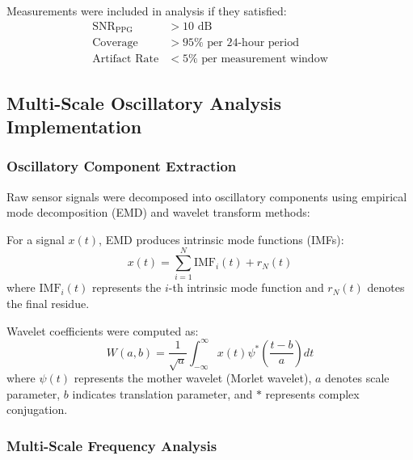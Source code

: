 \begin{definition}
Measurements were included in analysis if they satisfied:
\begin{align}
\text{SNR}_{\text{PPG}} &> 10 \text{ dB} \\
\text{Coverage} &> 95\% \text{ per 24-hour period} \\
\text{Artifact Rate} &< 5\% \text{ per measurement window}
\end{align}
\end{definition}

\subsection{Multi-Scale Oscillatory Analysis Implementation}

\subsubsection{Oscillatory Component Extraction}

Raw sensor signals were decomposed into oscillatory components using empirical mode decomposition (EMD) and wavelet transform methods:

\begin{definition}
For a signal $x(t)$, EMD produces intrinsic mode functions (IMFs):
\begin{equation}
x(t) = \sum_{i=1}^{N} \text{IMF}_i(t) + r_N(t)
\end{equation}
where $\text{IMF}_i(t)$ represents the $i$-th intrinsic mode function and $r_N(t)$ denotes the final residue.
\end{definition}

\begin{definition}
Wavelet coefficients were computed as:
\begin{equation}
W(a,b) = \frac{1}{\sqrt{a}} \int_{-\infty}^{\infty} x(t) \psi^*\left(\frac{t-b}{a}\right) dt
\end{equation}
where $\psi(t)$ represents the mother wavelet (Morlet wavelet), $a$ denotes scale parameter, $b$ indicates translation parameter, and $*$ represents complex conjugation.
\end{definition}

\subsubsection{Multi-Scale Frequency Analysis}

